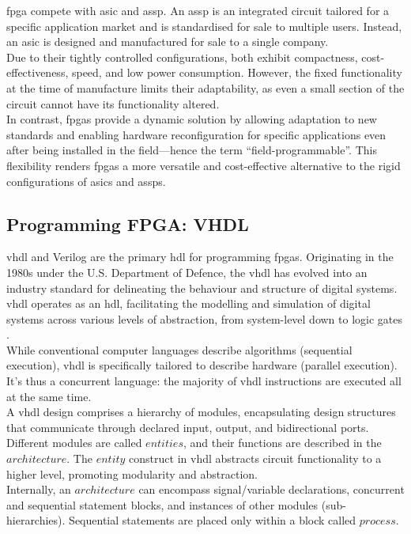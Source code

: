 \acrshort{fpga} compete with \acrfull{asic} and \acrfull{assp}. An \acrshort{assp} is an integrated circuit tailored for a specific application market and is standardised for sale to multiple users. Instead, an \acrshort{asic} is designed and manufactured for sale to a single company.\\
Due to their tightly controlled configurations, both exhibit compactness, cost-effectiveness, speed, and low power consumption. However, the fixed functionality at the time of manufacture limits their adaptability, as even a small section of the circuit cannot have its functionality altered.\\
In contrast, \acrshort{fpga}s provide a dynamic solution by allowing adaptation to new standards and enabling hardware reconfiguration for specific applications even after being installed in the field—hence the term 
\enquote{field-programmable}. This flexibility 
renders \acrshort{fpga}s a more versatile and 
cost-effective alternative to the 
rigid configurations of \acrshort{asic}s and \acrshort{assp}s.\\

\subsection{Programming FPGA: VHDL}
\label{subsection:VHDL}
\acrshort{vhdl} and Verilog are the primary \acrshort{hdl} for programming \acrshort{fpga}s. Originating in the 1980s under the U.S. Department of Defence, the \acrfull{vhdl} has evolved into an industry standard for delineating the behaviour and structure of digital systems. \acrshort{vhdl} operates as an \acrshort{hdl}, facilitating the modelling and simulation of digital systems across various levels of abstraction, from system-level down to logic gates \cite{Pellerin}.\\
While conventional computer languages describe algorithms (sequential execution), \acrshort{vhdl} is specifically tailored to describe hardware (parallel execution). It’s thus a concurrent language: the majority of \acrshort{vhdl} instructions are executed all at the same time.\\
A \acrshort{vhdl} design comprises a hierarchy of modules, 
encapsulating design structures that communicate 
through declared input, output, and bidirectional 
ports. Different modules are called $entities$, 
and their functions are described in the 
$architecture$. The $entity$ construct in \acrshort{vhdl} 
abstracts circuit functionality to a higher 
level, promoting modularity and abstraction.\\
Internally, an $architecture$ can encompass 
signal/variable declarations, concurrent and 
sequential statement blocks, and instances of 
other modules (sub-hierarchies). Sequential 
statements are placed only within a 
block called $process$.\\

